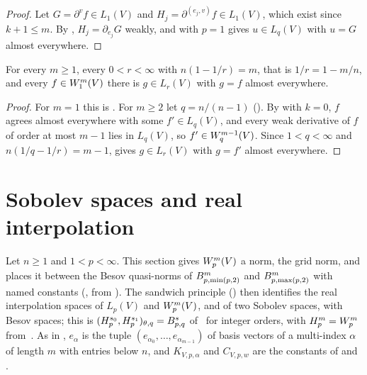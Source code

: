 \begin{proof}
\leanok
Let $G = \partial^v f \in L_1(V)$ and $H_j = \partial^{(e_j, v)} f \in L_1(V)$, which exist since
$k + 1 \leq m$. By , $H_j = \partial_{e_j} G$ weakly, and
 with $p = 1$ gives $u \in L_q(V)$ with $u = G$ almost
everywhere.
\end{proof}

\begin{theorem}[$\Sob{m}{1} \hookrightarrow L_r$ for $1/r = 1 - m/n$]
\label{thm:sobolev-l1-embedding}
\leanok
{}
For every $m \geq 1$, every $0 < r < \infty$ with $n(1 - 1/r) = m$, that is $1/r = 1 - m/n$,
and every $f \in W^{m}_{1}(V)$ there is $g \in L_r(V)$ with $g = f$ almost everywhere.
\end{theorem}

\begin{proof}
\leanok
For $m = 1$ this is . For $m \geq 2$ let $q = n/(n - 1)$
(). By  with $k = 0$, $f$ agrees
almost everywhere with some $f' \in L_q(V)$, and every weak derivative of $f$ of order at most
$m - 1$ lies in $L_q(V)$, so $f' \in W^{m-1}_{q}(V)$. Since $1 < q < \infty$ and
$n(1/q - 1/r) = m - 1$,  gives $g \in L_r(V)$ with $g = f'$
almost everywhere.
\end{proof}

\section{Sobolev spaces and real interpolation}
\label{sec:sobolev-interpolation}

Let $n \geq 1$ and $1 < p < \infty$. This section gives $W^{m}_{p}(V)$ a norm, the grid norm,
and places it between the Besov quasi-norms of $B^{m}_{p,\min(p,2)}$ and
$B^{m}_{p,\max(p,2)}$ with named constants (, from
). The sandwich principle
() then identifies the real interpolation spaces of
$L_p(V)$ and $W^{m}_{p}(V)$, and of two Sobolev spaces, with Besov spaces; this is
$(H^{s_0}_p, H^{s_1}_p)_{\theta,q} = B^{s}_{p,q}$ of~\cite[Theorem~6.4.5(4)]{BerghLofstrom}
for integer orders, with $H^m_p = W^{m}_{p}$ from~\cite[Theorem~6.2.3]{BerghLofstrom}. As in
, $e_\alpha$ is the tuple
$(e_{\alpha_0}, \dots, e_{\alpha_{m-1}})$ of basis vectors of a multi-index $\alpha$ of length
$m$ with entries below $n$, and $K_{V,p,\alpha}$ and $C_{V,p,w}$ are the constants of
 and .

